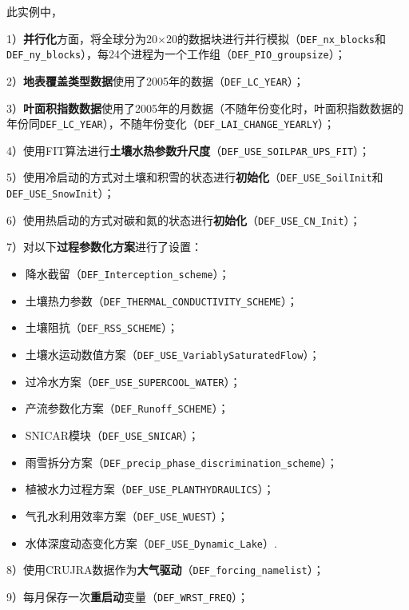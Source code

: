 此实例中，\par
1）\textbf{并行化}方面，将全球分为20\textdegree$\times$20\textdegree 的数据块进行并行模拟（\texttt{DEF\_nx\_blocks}和\texttt{DEF\_ny\_blocks}），每24个进程为一个工作组（\texttt{DEF\_PIO\_groupsize}）；\par
2）\textbf{地表覆盖类型数据}使用了2005年的数据（\texttt{DEF\_LC\_YEAR}）；\par
3）\textbf{叶面积指数数据}使用了2005年的月数据（不随年份变化时，叶面积指数数据的年份同\texttt{DEF\_LC\_YEAR}），不随年份变化（\texttt{DEF\_LAI\_CHANGE\_YEARLY}）；\par
4）使用FIT算法进行\textbf{土壤水热参数升尺度}（\texttt{DEF\_USE\_SOILPAR\_UPS\_FIT}）；\par
5）使用冷启动的方式对土壤和积雪的状态进行\textbf{初始化}（\texttt{DEF\_USE\_SoilInit}和\texttt{DEF\_\allowbreak USE\_\allowbreak SnowInit}）；\par
6）使用热启动的方式对碳和氮的状态进行\textbf{初始化}（\texttt{DEF\_USE\_CN\_Init}）；\par
7）对以下\textbf{过程参数化方案}进行了设置：
\begin{itemize}[nosep,leftmargin=4em]
    \item 降水截留（\texttt{DEF\_Interception\_scheme}）；
    \item 土壤热力参数（\texttt{DEF\_THERMAL\_CONDUCTIVITY\_SCHEME}）；
    \item 土壤阻抗（\texttt{DEF\_RSS\_SCHEME}）；
    \item 土壤水运动数值方案（\texttt{DEF\_USE\_VariablySaturatedFlow}）；
    \item 过冷水方案（\texttt{DEF\_USE\_SUPERCOOL\_WATER}）；
    \item 产流参数化方案（\texttt{DEF\_Runoff\_SCHEME}）；
    \item SNICAR模块（\texttt{DEF\_USE\_SNICAR}）；
    \item 雨雪拆分方案（\texttt{DEF\_precip\_phase\_discrimination\_scheme}）；
    \item 植被水力过程方案（\texttt{DEF\_USE\_PLANTHYDRAULICS}）；
    \item 气孔水利用效率方案（\texttt{DEF\_USE\_WUEST}）；
    \item 水体深度动态变化方案（\texttt{DEF\_USE\_Dynamic\_Lake}）.
\end{itemize}
\par
8）使用CRUJRA数据作为\textbf{大气驱动}（\texttt{DEF\_forcing\_namelist}）；\par
9）每月保存一次\textbf{重启动}变量（\texttt{DEF\_WRST\_FREQ}）；\par
